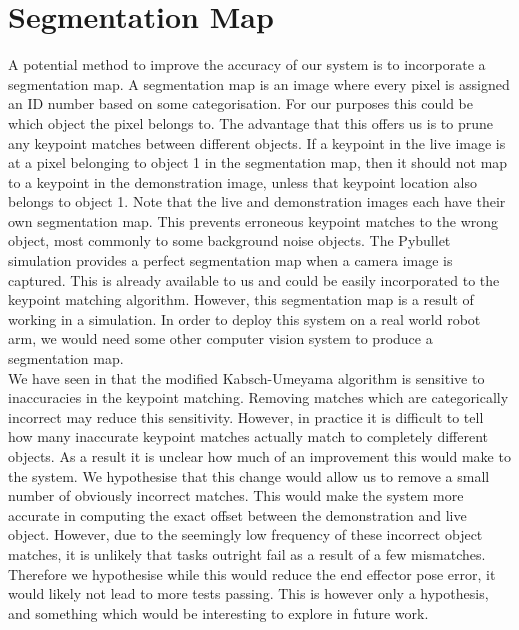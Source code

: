 \section{Segmentation Map}
A potential method to improve the accuracy of our system is to incorporate a segmentation map. A segmentation map is an image where every pixel is assigned an ID number based on some categorisation. For our purposes this could be which object the pixel belongs to. The advantage that this offers us is to prune any keypoint matches between different objects. If a keypoint in the live image is at a pixel belonging to object 1 in the segmentation map, then it should not map to a keypoint in the demonstration image, unless that keypoint location also belongs to object 1. Note that the live and demonstration images each have their own segmentation map. This prevents erroneous keypoint matches to the wrong object, most commonly to some background noise objects. The Pybullet simulation provides a perfect segmentation map when a camera image is captured. This is already available to us and could be easily incorporated to the keypoint matching algorithm. However, this segmentation map is a result of working in a simulation. In order to deploy this system on a real world robot arm, we would need some other computer vision system to produce a segmentation map.\\

We have seen in  that the modified Kabsch-Umeyama algorithm is sensitive to inaccuracies in the keypoint matching. Removing matches which are categorically incorrect may reduce this sensitivity. However, in practice it is difficult to tell how many inaccurate keypoint matches actually match to completely different objects. As a result it is unclear how much of an improvement this would make to the system. We hypothesise that this change would allow us to remove a small number of obviously incorrect matches. This would make the system more accurate in computing the exact offset between the demonstration and live object. However, due to the seemingly low frequency of these incorrect object matches, it is unlikely that tasks outright fail as a result of a few mismatches. Therefore we hypothesise while this would reduce the end effector pose error, it would likely not lead to more tests passing. This is however only a hypothesis, and something which would be interesting to explore in future work.

